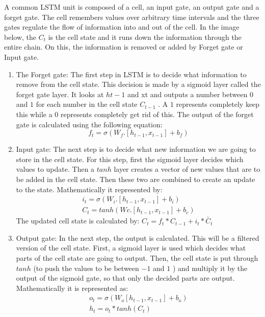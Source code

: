     A common LSTM unit is composed of a cell, an input gate, an output gate and a forget gate. The cell remembers values over arbitrary time intervals and the three gates regulate the flow of information into and out of the cell.
    In the image below, the $C_t $ is the cell state and it runs down the information through the entire chain. On this, the information is removed or added by Forget gate or Input gate. 
    \begin{enumerate}
    	\item The Forget gate: The first step in LSTM is to decide what information to remove from the cell state. This decision is made by a sigmoid layer called the forget gate layer. It looks at $h{t-1}$  and xt and outputs a number between $0$ and $1$  for each number in the cell state $C_{t-1} $ . A $1$ represents completely keep this while a $0$  represents completely get rid of this. The output of the forget gate is calculated using the following equation: 
    	 \begin{equation}
    	 f_t=\sigma(W_f.[h_{t-1},x_{t-1}]+b_f)
    	 \end{equation}
    	 \item Input gate: The next step is to decide what new information we are going to store in the cell state. For this step, first the sigmoid layer decides which values to update. Then a $tanh$ layer creates a vector of new values that are to be added in the cell state. Then these two are combined to create an update to the state. Mathematically it represented by: 
    	 \begin{gather}
    	 i_t=\sigma (W_i.[h_{t-1},x_{t-1}]+b_i)	\\		
    	 C_t=tanh(Wc.[h_{t-1},x_{t-1}]+b_c)
    	 \end{gather}
    	 The updated cell state is calculated by: $C_t=f_t*C_{t-1}+i_t*\bar{C}_t$
    	 \item Output gate: In the next step, the output is calculated. This will be a filtered version of the cell state. First, a sigmoid layer is used which decides what parts of the cell state are going to output. Then, the cell state is put through $tanh$ (to push the values to be between $-1$ and $1$ ) and multiply it by the output of the sigmoid gate, so that only the decided parts are output. Mathematically it is represented as: 
    	  \begin{gather}
    	o_t=\sigma (W_o[h_{t-1},x_{t-1}]+b_o)\\				
    	h_t=o_t*tanh(C_t)
    	  \end{gather}
    	 
    \end{enumerate}
 
